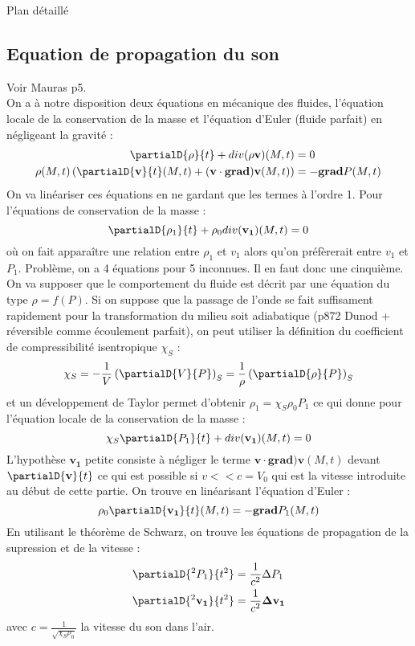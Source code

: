 \begin{reportBlock}{Plan détaillé}
  \subsection{Equation de propagation du son}
  Voir Mauras p5.\\
  On a à notre disposition deux équations en mécanique des fluides, l'équation locale de la conservation de la masse et l'équation d'Euler (fluide parfait) en négligeant la gravité :
  \begin{align}
      \partialD{\rho}{t} + div(\rho\mathbf{v})(M,t) &= 0 \\
      \rho(M,t)\left(\partialD{\mathbf{v}}{t}(M,t) + (\mathbf{v}\cdot\mathbf{grad})\mathbf{v}(M,t) \right) &= -\mathbf{grad}P(M,t)
  \end{align}
  On va linéariser ces équations en ne gardant que les termes à l'ordre 1. Pour l'équations de conservation de la masse :
  \begin{equation}
      \partialD{\rho_1}{t} + \rho_0div(\mathbf{v_1})(M,t) = 0
  \end{equation}
  où on fait apparaître une relation entre $\rho_1$ et $v_1$ alors qu'on préfèrerait entre $v_1$ et $P_1$. Problème, on a 4 équations pour 5 inconnues. Il en faut donc une cinquième. On va supposer que le comportement du fluide est décrit par une équation du type $\rho =f(P)$. Si on suppose que la passage de l'onde se fait suffisament rapidement pour la transformation du milieu soit adiabatique (p872 Dunod + réversible comme écoulement parfait), on peut utiliser la définition du coefficient de compressibilité isentropique $\chi_S$ :
  \begin{equation}
      \chi_S = -\frac{1}{V}\left(\partialD{V}{P}\right)_S = \frac{1}{\rho}\left(\partialD{\rho}{P}\right)_S
  \end{equation}
  et un développement de Taylor permet d'obtenir $\rho_1 = \chi_S\rho_0P_1$ ce qui donne pour l'équation locale de la conservation de la masse :
  \begin{equation}
      \chi_S\partialD{P_1}{t} + div(\mathbf{v_1})(M,t) = 0
  \end{equation}
  L'hypothèse $\mathbf{v_1}$ petite consiste à négliger le terme $\mathbf{v}\cdot\mathbf{grad})\mathbf{v}(M,t)$ devant $\partialD{\mathbf{v}}{t}$ ce qui est possible si $v<<c=V_0$ qui est la vitesse introduite au début de cette partie. On trouve en linéarisant l'équation d'Euler :
  \begin{equation}
      \rho_0\partialD{\mathbf{v_1}}{t}(M,t) = -\mathbf{grad}P_1(M,t)
  \end{equation}
  En utilisant le théorème de Schwarz, on trouve les équations de propagation de la supression et de la vitesse :
  \begin{align}
    \partialD{^2P_1}{t^2} &= \frac{1}{c^2}\Delta P_1 \\
    \partialD{^2\mathbf{v_1}}{t^2} &= \frac{1}{c^2}\mathbf{\Delta v_1}     
  \end{align}
  avec $c = \frac{1}{\sqrt{\chi_S\rho_0}}$ la vitesse du son dans l'air.\\


\end{reportBlock}
